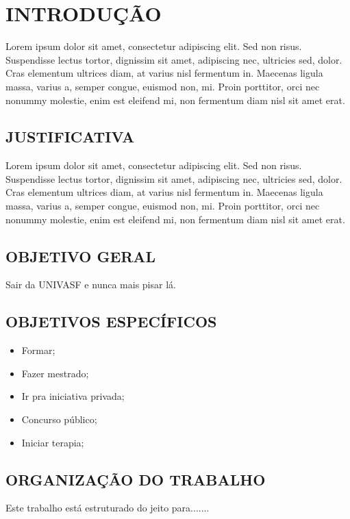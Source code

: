 \chapter{INTRODUÇÃO}

Lorem ipsum dolor sit amet, consectetur adipiscing elit. Sed non risus. Suspendisse lectus tortor, dignissim sit amet, adipiscing nec, ultricies sed, dolor. Cras elementum ultrices diam, at varius nisl fermentum in. Maecenas ligula massa, varius a, semper congue, euismod non, mi. Proin porttitor, orci nec nonummy molestie, enim est eleifend mi, non fermentum diam nisl sit amet erat.


\section{JUSTIFICATIVA}

Lorem ipsum dolor sit amet, consectetur adipiscing elit. Sed non risus. Suspendisse lectus tortor, dignissim sit amet, adipiscing nec, ultricies sed, dolor. Cras elementum ultrices diam, at varius nisl fermentum in. Maecenas ligula massa, varius a, semper congue, euismod non, mi. Proin porttitor, orci nec nonummy molestie, enim est eleifend mi, non fermentum diam nisl sit amet erat. 



\section{OBJETIVO GERAL}

Sair da UNIVASF e nunca mais pisar lá.

\section{OBJETIVOS ESPECÍFICOS}

\begin{itemize}
    \item Formar;
    \item Fazer mestrado;
    \item Ir pra iniciativa privada;
    \item Concurso público;
    \item Iniciar terapia; 
\end{itemize}

\section{ORGANIZAÇÃO DO TRABALHO}

Este trabalho está estruturado do jeito para.......